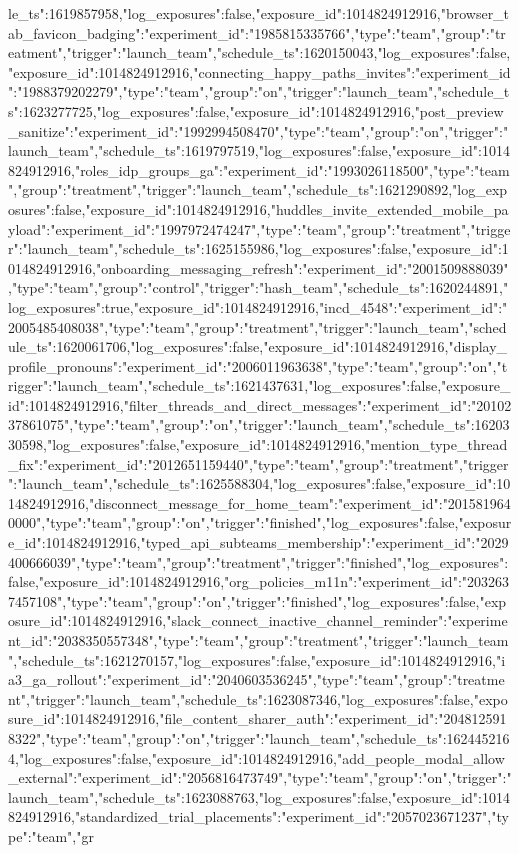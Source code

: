 {le_ts":1619857958,"log_exposures":false,"exposure_id":1014824912916},"browser_tab_favicon_badging":{"experiment_id":"1985815335766","type":"team","group":"treatment","trigger":"launch_team","schedule_ts":1620150043,"log_exposures":false,"exposure_id":1014824912916},"connecting_happy_paths_invites":{"experiment_id":"1988379202279","type":"team","group":"on","trigger":"launch_team","schedule_ts":1623277725,"log_exposures":false,"exposure_id":1014824912916},"post_preview_sanitize":{"experiment_id":"1992994508470","type":"team","group":"on","trigger":"launch_team","schedule_ts":1619797519,"log_exposures":false,"exposure_id":1014824912916},"roles_idp_groups_ga":{"experiment_id":"1993026118500","type":"team","group":"treatment","trigger":"launch_team","schedule_ts":1621290892,"log_exposures":false,"exposure_id":1014824912916},"huddles_invite_extended_mobile_payload":{"experiment_id":"1997972474247","type":"team","group":"treatment","trigger":"launch_team","schedule_ts":1625155986,"log_exposures":false,"exposure_id":1014824912916},"onboarding_messaging_refresh":{"experiment_id":"2001509888039","type":"team","group":"control","trigger":"hash_team","schedule_ts":1620244891,"log_exposures":true,"exposure_id":1014824912916},"incd_4548":{"experiment_id":"2005485408038","type":"team","group":"treatment","trigger":"launch_team","schedule_ts":1620061706,"log_exposures":false,"exposure_id":1014824912916},"display_profile_pronouns":{"experiment_id":"2006011963638","type":"team","group":"on","trigger":"launch_team","schedule_ts":1621437631,"log_exposures":false,"exposure_id":1014824912916},"filter_threads_and_direct_messages":{"experiment_id":"2010237861075","type":"team","group":"on","trigger":"launch_team","schedule_ts":1620330598,"log_exposures":false,"exposure_id":1014824912916},"mention_type_thread_fix":{"experiment_id":"2012651159440","type":"team","group":"treatment","trigger":"launch_team","schedule_ts":1625588304,"log_exposures":false,"exposure_id":1014824912916},"disconnect_message_for_home_team":{"experiment_id":"2015819640000","type":"team","group":"on","trigger":"finished","log_exposures":false,"exposure_id":1014824912916},"typed_api_subteams_membership":{"experiment_id":"2029400666039","type":"team","group":"treatment","trigger":"finished","log_exposures":false,"exposure_id":1014824912916},"org_policies_m11n":{"experiment_id":"2032637457108","type":"team","group":"on","trigger":"finished","log_exposures":false,"exposure_id":1014824912916},"slack_connect_inactive_channel_reminder":{"experiment_id":"2038350557348","type":"team","group":"treatment","trigger":"launch_team","schedule_ts":1621270157,"log_exposures":false,"exposure_id":1014824912916},"ia3_ga_rollout":{"experiment_id":"2040603536245","type":"team","group":"treatment","trigger":"launch_team","schedule_ts":1623087346,"log_exposures":false,"exposure_id":1014824912916},"file_content_sharer_auth":{"experiment_id":"2048125918322","type":"team","group":"on","trigger":"launch_team","schedule_ts":1624452164,"log_exposures":false,"exposure_id":1014824912916},"add_people_modal_allow_external":{"experiment_id":"2056816473749","type":"team","group":"on","trigger":"launch_team","schedule_ts":1623088763,"log_exposures":false,"exposure_id":1014824912916},"standardized_trial_placements":{"experiment_id":"2057023671237","type":"team","gr}

